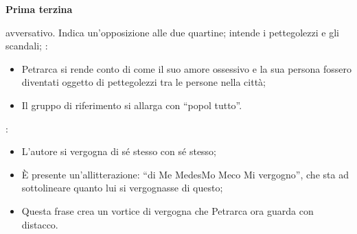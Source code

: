 \documentclass{article}
\begin{document}
\begin{enumerate}
\begin{itemize}[label=]
        \textbf{Prima terzina}
            \begin{enumerate}[label=]
                 avversativo. Indica un'opposizione alle due quartine;
                 intende i pettegolezzi e gli scandali;
                :
                        \begin{itemize}
                            \item Petrarca si rende conto di come il suo amore ossessivo e
                                la sua persona fossero diventati oggetto di pettegolezzi tra
                                le persone nella città;
                            \item Il gruppo di riferimento si allarga con ``popol tutto''.
                        \end{itemize}
                :
                    \begin{itemize}
                        \item L'autore si vergogna di sé stesso con sé stesso;
                        \item È presente un'allitterazione: ``di Me MedesMo Meco Mi vergogno'',
                            che sta ad sottolineare quanto lui si vergognasse di questo;
                        \item Questa frase crea un vortice di vergogna che Petrarca ora guarda
                            con distacco.
                    \end{itemize}
            \end{enumerate}
        

\end{itemize}
\end{enumerate}
\end{document}
